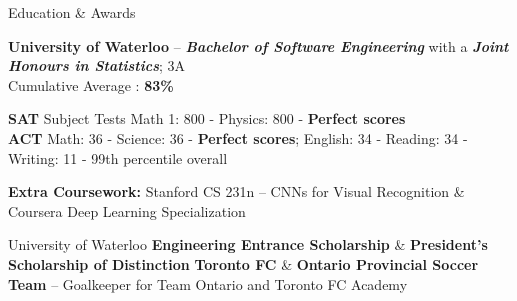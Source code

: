 \documentclass{resume} %
\begin{document}
\begin{rSection}{Education \& Awards}

\textbf{University of Waterloo} -- \textbf{\textit{Bachelor of Software Engineering}} with a \textbf{\textit{Joint Honours in Statistics}}; 3A \\
Cumulative Average : \textbf{83}\textbf{\% }
\item \textbf{SAT} Subject Tests Math 1: 800 - Physics: 800 -  \textbf{Perfect scores} \\ \textbf{ACT} Math: 36 - Science: 36 - \textbf{Perfect scores}; English: 34 - Reading: 34 - Writing: 11 - 99th percentile overall

\textbf{Extra Coursework:} Stanford CS 231n -- CNNs for Visual Recognition \& Coursera Deep Learning Specialization 

University of Waterloo \textbf{Engineering Entrance Scholarship} \& \textbf{President's Scholarship of Distinction} 
\textbf{Toronto FC} \& \textbf{Ontario Provincial Soccer Team} -- Goalkeeper for Team Ontario and Toronto FC Academy  

\end{rSection}





\end{document}
